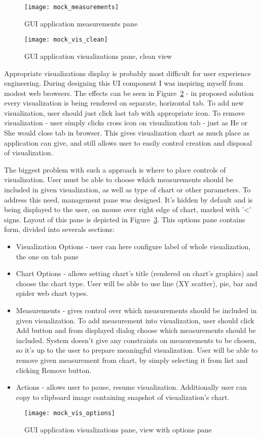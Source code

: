 \begin{figure}[ht]
  \centering
  \texttt{[image: mock\_measurements]}
  \caption{GUI application measurements pane}
  \label{fig:mock_measurements}
\end{figure}



\begin{figure}[ht]
  \centering
  \texttt{[image: mock\_vis\_clean]}
  \caption{GUI application visualizations pane, clean view}
  \label{fig:mock_vis_clean}
\end{figure}

Appropriate visualizations display is probably most difficult for user experience engineering. During designing this UI
component I was inspiring myself from modest web browsers. The effects can be seen in Figure~\ref{fig:mock_vis_clean} -
in proposed solution every visualization is being rendered on separate, horizontal tab. To add new visualization, user
should just click last tab with appropriate icon. To remove visualization - user simply clicks cross icon on
visualization tab - just as He or She would close tab in browser. This gives visualization chart as much place as
application can give, and still allows user to easily control creation and disposal of visualization.

The biggest problem with such a approach is where to place controls of visualization. User must be able to choose which
measurements should be included in given visualization, as well as type of chart or other parameters. To address this
need, management pane was designed. It's hidden by default and is being displayed to the user, on mouse over right
edge of chart, marked with '<' signs. Layout of this pane is depicted in Figure~\ref{fig:mock_vis_options}. This
options pane contains form, divided into severals sections:

\begin{itemize}
 \item Visualization Options - user can here configure label of whole visualization, the one on tab pane
 \item Chart Options - allows setting chart's title (rendered on chart's graphics) and choose the chart type. User will
be able to use line (XY scatter), pie, bar and  spider web chart types.
 \item Measurements - gives control over which measurements should be included in given visualization. To add
measurement into visualization, user should click Add button and from displayed dialog choose which measurements should
be included. System doesn't give any constraints on measurements to be chosen, so it's up to the user to prepare
meaningful visualization. User will be able to remove given measurement from chart, by simply selecting it from list
and clicking Remove button.
 \item Actions - allows user to pause, resume visualization. Additionally user can copy to clipboard image containing
snapshot of visualization's chart.
\end{itemize}


\begin{figure}[ht]
  \centering
  \texttt{[image: mock\_vis\_options]}
  \caption{GUI application visualizations pane, view with options pane}
  \label{fig:mock_vis_options}
\end{figure}


